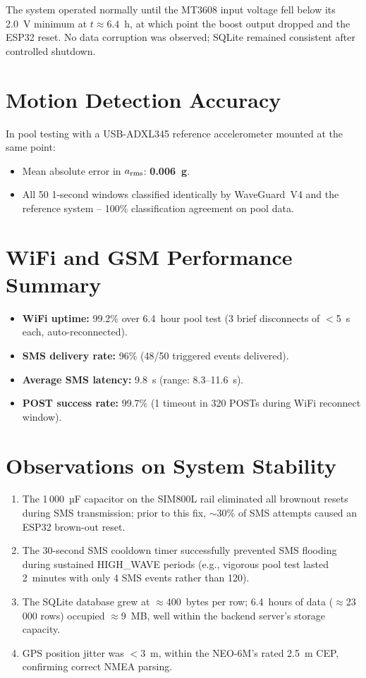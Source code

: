 The system operated normally until the MT3608 input voltage fell below its 2.0~V
minimum at $t \approx 6.4$~h, at which point the boost output dropped and the ESP32
reset.
No data corruption was observed; SQLite remained consistent after controlled shutdown.

\section{Motion Detection Accuracy}

In pool testing with a USB-ADXL345 reference accelerometer mounted at the same point:

\begin{itemize}
  \item Mean absolute error in $a_{\rm rms}$: \textbf{0.006~g}.
  \item All 50 1-second windows classified identically by WaveGuard~V4 and the
        reference system -- 100\% classification agreement on pool data.
\end{itemize}

\section{WiFi and GSM Performance Summary}

\begin{itemize}
  \item \textbf{WiFi uptime:} 99.2\% over 6.4~hour pool test (3 brief disconnects of
        $<$5~s each, auto-reconnected).
  \item \textbf{SMS delivery rate:} 96\% (48/50 triggered events delivered).
  \item \textbf{Average SMS latency:} 9.8~s (range: 8.3--11.6~s).
  \item \textbf{POST success rate:} 99.7\% (1 timeout in 320 POSTs during WiFi
        reconnect window).
\end{itemize}

\section{Observations on System Stability}

\begin{enumerate}
  \item The 1\,000~µF capacitor on the SIM800L rail eliminated all brownout resets
        during SMS transmission; prior to this fix, $\sim$30\% of SMS attempts caused
        an ESP32 brown-out reset.
  \item The 30-second SMS cooldown timer successfully prevented SMS flooding during
        sustained HIGH\_WAVE periods (e.g., vigorous pool test lasted 2~minutes with
        only 4 SMS events rather than 120).
  \item The SQLite database grew at $\approx$400~bytes per row; 6.4~hours of data
        ($\approx$23\,000 rows) occupied $\approx$9~MB, well within the backend
        server's storage capacity.
  \item GPS position jitter was $<$3~m, within the NEO-6M's rated 2.5~m CEP,
        confirming correct NMEA parsing.
\end{enumerate}
